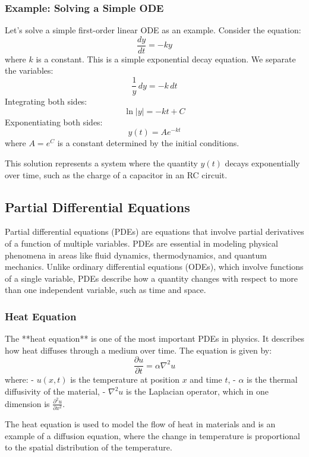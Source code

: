 \documentclass{article}
\begin{document}
\subsubsection*{Example: Solving a Simple ODE}

Let's solve a simple first-order linear ODE as an example. Consider the equation:
\[
\frac{dy}{dt} = -ky
\]
where \( k \) is a constant. This is a simple exponential decay equation. We separate the variables:
\[
\frac{1}{y} \, dy = -k \, dt
\]
Integrating both sides:
\[
\ln |y| = -kt + C
\]
Exponentiating both sides:
\[
y(t) = A e^{-kt}
\]
where \( A = e^C \) is a constant determined by the initial conditions.

This solution represents a system where the quantity \( y(t) \) decays exponentially over time, such as the charge of a capacitor in an RC circuit.

\subsection{Partial Differential Equations}

Partial differential equations (PDEs) are equations that involve partial derivatives of a function of multiple variables. PDEs are essential in modeling physical phenomena in areas like fluid dynamics, thermodynamics, and quantum mechanics. Unlike ordinary differential equations (ODEs), which involve functions of a single variable, PDEs describe how a quantity changes with respect to more than one independent variable, such as time and space.

\subsubsection*{Heat Equation}

The **heat equation** is one of the most important PDEs in physics. It describes how heat diffuses through a medium over time. The equation is given by:
\[
\frac{\partial u}{\partial t} = \alpha \nabla^2 u
\]
where:
- \( u(x, t) \) is the temperature at position \( x \) and time \( t \),
- \( \alpha \) is the thermal diffusivity of the material,
- \( \nabla^2 u \) is the Laplacian operator, which in one dimension is \( \frac{\partial^2 u}{\partial x^2} \).

The heat equation is used to model the flow of heat in materials and is an example of a diffusion equation, where the change in temperature is proportional to the spatial distribution of the temperature.
\end{document}
